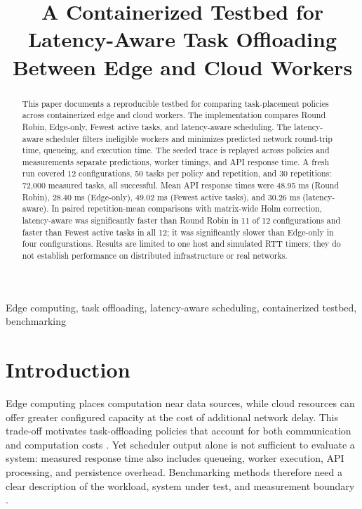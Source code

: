 \documentclass[conference]{IEEEtran}
\begin{document}
        \title{A Containerized Testbed for Latency-Aware Task Offloading Between Edge and Cloud Workers}
        \author{
        }
        \maketitle

        \begin{abstract}
        This paper documents a reproducible testbed for comparing task-placement policies across containerized edge and cloud workers. The implementation compares Round Robin, Edge-only, Fewest active tasks, and latency-aware scheduling. The latency-aware scheduler filters ineligible workers and minimizes predicted network round-trip time, queueing, and execution time. The seeded trace is replayed across policies and measurements separate predictions, worker timings, and API response time. A fresh run covered 12 configurations, 50 tasks per policy and repetition, and 30 repetitions: 72,000 measured tasks, all successful. Mean API response times were 48.95 ms (Round Robin), 28.40 ms (Edge-only), 49.02 ms (Fewest active tasks), and 30.26 ms (latency-aware). In paired repetition-mean comparisons with matrix-wide Holm correction, latency-aware was significantly faster than Round Robin in 11 of 12 configurations and faster than Fewest active tasks in all 12; it was significantly slower than Edge-only in four configurations. Results are limited to one host and simulated RTT timers; they do not establish performance on distributed infrastructure or real networks.
        \end{abstract}

        \begin{IEEEkeywords}
        Edge computing, task offloading, latency-aware scheduling, containerized testbed, benchmarking
        \end{IEEEkeywords}

        \section{Introduction}
        Edge computing places computation near data sources, while cloud resources can offer greater configured capacity at the cost of additional network delay. This trade-off motivates task-offloading policies that account for both communication and computation costs \cite{satya,shi,mach}. Yet scheduler output alone is not sufficient to evaluate a system: measured response time also includes queueing, worker execution, API processing, and persistence overhead. Benchmarking methods therefore need a clear description of the workload, system under test, and measurement boundary \cite{varghese}.
\end{document}
